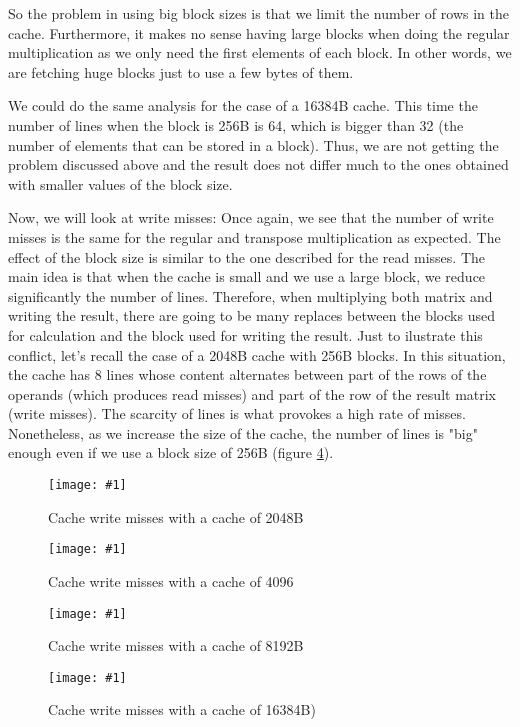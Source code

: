 \documentclass{article}
\newcommand{\myFigure}[4]{%
    \begin{figure}[!ht]
        \texttt{[image: \#1]}
        \centering
        \caption{#2}
        \label{#3}
    \end{figure}
}
\begin{document}
So the problem in using big block sizes is that we limit the number of rows in the cache. Furthermore, it makes no sense having large blocks when doing the regular multiplication as we only need the first elements of each block. In other words, we are fetching huge blocks just to use a few bytes of them.

We could do the same analysis for the case of a 16384B cache. 
This time the number of lines when the block is 256B is 64, which is bigger than 32 (the number of elements that can be stored in a block).
Thus, we are not getting the problem discussed above and the result does not differ much to the ones obtained with smaller values of the block size.

\pagebreak

Now, we will look at write misses:
Once again, we see that the number of write misses is the same for the regular and transpose multiplication as expected. The effect of the block size is similar to the one described for the read misses. The main idea is that when the cache is small and we use a large block, we reduce significantly the number of lines. Therefore, when multiplying both matrix and writing the result, there are going to be many replaces between the blocks used for calculation and the block used for writing the result. Just to ilustrate this conflict, let's recall the case of a 2048B cache with 256B blocks. In this situation, the cache has 8 lines whose content alternates between part of the rows of the operands (which produces read misses) and part of the row of the result matrix (write misses). The scarcity of lines is what provokes a high rate of misses. Nonetheless, as we increase the size of the cache, the number of lines is "big" enough even if we use a block size of 256B (figure \ref{block_16384B_esc}).


\myFigure{../material_P3/protect_out4/BlockSize_2048/cache_escritura.png}{Cache write misses with a cache of 2048B}{block_2048_esc}{0.52}


\myFigure{../material_P3/protect_out4/BlockSize_4096/cache_escritura.png}{Cache write misses with a cache of 4096}{block_4096_esc}{0.52}

\myFigure{../material_P3/protect_out4/BlockSize_8192/cache_escritura.png}{Cache write misses with a cache of 8192B}{block_8192B_esc}{0.52}

\myFigure{../material_P3/protect_out4/BlockSize_16384/cache_escritura.png}{Cache write misses with a cache of 16384B)}{block_16384B_esc}{0.52}
\end{document}
